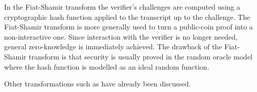 In the Fiat-Shamir transform \cite{FiatShamir} the verifier's challenges are computed using a cryptographic hash function applied to the transcript up to the challenge. The Fiat-Shamir transform is more generally used to turn a public-coin proof into a non-interactive one. Since interaction with the verifier is no longer needed, general zero-knowledge is immediately achieved. The drawback of the Fiat-Shamir transform is that security is usually proved in the random oracle model \cite{bellarerogaway} where the hash function is modelled as an ideal random function.%

Other transformations such as \cite{Damgard2000,MP03,GoldreichSV98} have already been discussed.
%
%
%
%
